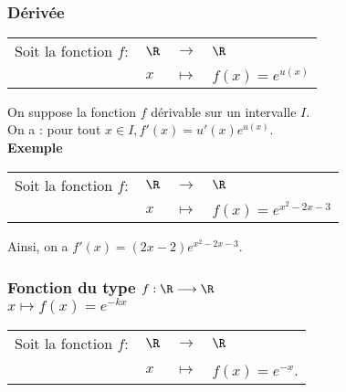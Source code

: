 \subsubsection{Dérivée}

\begin{tabular}{llll}
Soit la fonction $f:$ & $\R$ & $\longrightarrow$ & $\R$ \\
& $x$ & $\longmapsto$ & $f(x) = e^{u\left(x\right)}$ \\
\end{tabular}

\vspace*{.3cm}

On suppose la fonction $f$ dérivable sur un intervalle $I$. \\

On a : pour tout $x \in I, f'\left(x\right) = u'\left(x\right)e^{u\left(x\right)}$. \\

\textbf{Exemple} \\

\begin{tabular}{llll}
Soit la fonction $f:$ & $\R$ & $\longrightarrow$ & $\R$ \\
& $x$ & $\longmapsto$ & $f(x) = e^{x^2 - 2x - 3}$ \\
\end{tabular}

\vspace*{.3cm}

Ainsi, on a $f'(x) = \left(2x-2\right)e^{x^2-2x-3}$. 

\vspace*{-5cm}

\newpage

\vspace*{-2cm}

\subsubsection{Fonction du type $f: \R \longrightarrow \R$ \\ \hspace*{3.2cm} $x \longmapsto f(x) = e^{-kx}$}

\begin{tabular}{llll}
\hspace*{-.3cm} Soit la fonction $f:$ & $\R$ & $\longrightarrow$ & $\R$ \\
& $x$ & $\longmapsto$ & $f(x) = e^{-x}$. \\
\end{tabular}

